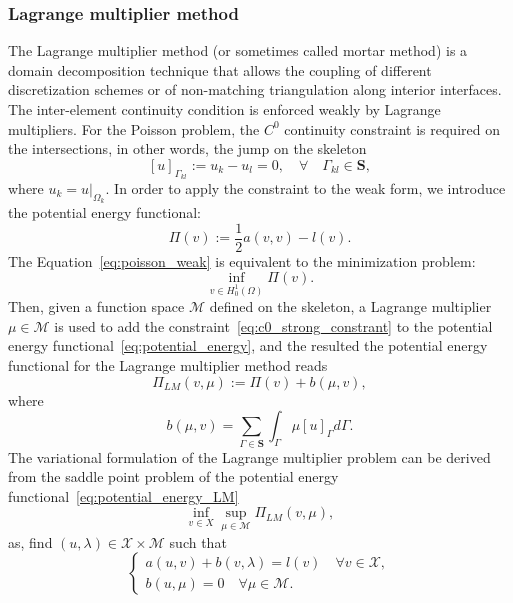 \documentclass[preprint,12pt]{elsarticle}
\begin{document}
\subsubsection{Lagrange multiplier method}
The Lagrange multiplier method (or sometimes called mortar method) is a domain decomposition technique that allows the coupling of different discretization schemes or of non-matching triangulation along interior interfaces. The inter-element continuity condition is enforced weakly by Lagrange multipliers. For the Poisson problem, the $C^0$ continuity constraint is required on the intersections, in other words, the jump on the skeleton
\begin{equation}
    \left[u\right]_{\Gamma_{kl}}:=u_k-u_l=0, \quad \forall \quad\Gamma_{kl}\in\mathbf{S},\label{eq:c0_strong_constrant}
\end{equation}
where $u_k=u\vert_{\Omega_k}$. In order to apply the constraint to the weak form, we introduce the potential energy functional:
\begin{equation}
    \Pi(v):=\frac{1}{2}a(v,v)-l(v).\label{eq:potential_energy}
\end{equation} 
The Equation~\eqref{eq:poisson_weak} is equivalent to the minimization problem:
\begin{equation}
    \inf_{v\in{H^1_0(\Omega)}}\Pi(v).
\end{equation}
Then, given a function space $\mathcal{M}$ defined on the skeleton, a Lagrange multiplier $\mu\in{\mathcal{M}}$ is used to add the constraint~\eqref{eq:c0_strong_constrant} to the potential energy functional~\eqref{eq:potential_energy}, and the resulted the potential energy functional for the Lagrange multiplier method reads
\begin{equation}
    \Pi_{LM}(v,\mu):=\Pi(v)+b(\mu,v),\label{eq:potential_energy_LM}
\end{equation}
where
\begin{equation}
    b(\mu,v)=\sum_{\Gamma\in\mathbf{S}}\int_\Gamma\mu\left[u\right]_{\Gamma}d\Gamma.
\end{equation}
The variational formulation of the Lagrange multiplier problem can be derived from the saddle point problem of the potential energy functional~\eqref{eq:potential_energy_LM}
\begin{equation}
    \inf_{v\in{X}}\sup_{\mu\in{\mathcal{M}}}\Pi_{LM}(v,\mu),
\end{equation}
as, find $(u,\lambda)\in{\mathcal{X}}\times{\mathcal{M}}$ such that
\begin{equation}
    \left\{
    \begin{array}{ll}
        a(u,v)+b(v,\lambda)=l(v) \quad \forall v\in{\mathcal{X}},\\
        b(u,\mu)=0 \quad \forall \mu\in{\mathcal{M}}.\label{eq:mixed_form}
    \end{array}
    \right.
\end{equation}
\end{document}
